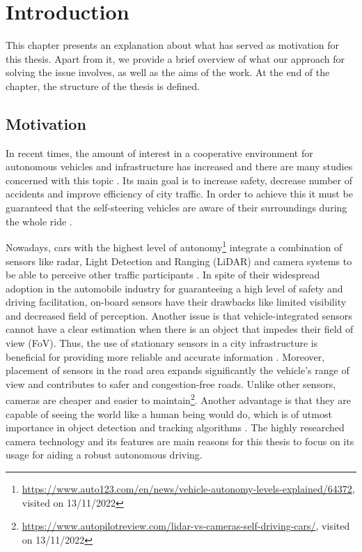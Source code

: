 \chapter{Introduction}
\label{introduction}
This chapter presents an explanation about what has served as motivation for this thesis. Apart from it, we provide a brief overview of what our approach for solving the issue involves, as well as the aims of the work. At the end of the chapter, the structure of the thesis is defined.

\section{Motivation}
In recent times, the amount of interest in a cooperative environment for autonomous vehicles and infrastructure has increased and there are many studies concerned with this topic \cite{cvis_article_one, cvis_article_two}. Its main goal is to increase safety, decrease number of accidents and improve efficiency of city traffic. In order to achieve this it must be guaranteed that the self-steering vehicles are aware of their surroundings during the whole ride \cite{onboard_sensors}.

Nowadays, cars with the highest level of autonomy\footnote{\url{https://www.auto123.com/en/news/vehicle-autonomy-levels-explained/64372}, visited on 13/11/2022} integrate a combination of sensors like radar, Light Detection and Ranging (LiDAR) and camera systems to be able to perceive other traffic participants \cite{autonomous_cars_sensors}. In spite of their widespread adoption in the automobile industry for guaranteeing a high level of safety and driving facilitation, on-board sensors have their drawbacks like limited visibility and decreased field of perception. Another issue is that vehicle-integrated sensors cannot have a clear estimation when there is an object that impedes their field of view (FoV). Thus, the use of stationary sensors in a city infrastructure is beneficial for providing more reliable and accurate information \cite{roadside_lidar}. Moreover, placement of sensors in the road area expands significantly the vehicle's range of view and contributes to safer and congestion-free roads. Unlike other sensors, cameras are cheaper and easier to maintain\footnote{\url{https://www.autopilotreview.com/lidar-vs-cameras-self-driving-cars/}, visited on 13/11/2022}. Another advantage is that they are capable of seeing the world like a human being would do, which is of utmost importance in object detection and tracking algorithms \cite{camera_object_detection}. The highly researched camera technology and its features are main reasons for this thesis to focus on its usage for aiding a robust autonomous driving.

